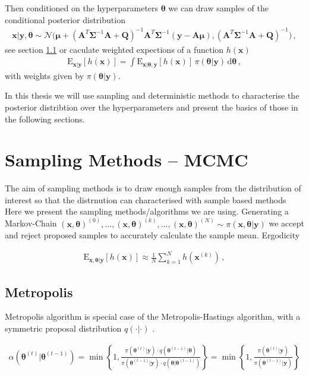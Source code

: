 Then conditioned on the hyperparameters $\bm{\theta}$ we can draw samples of the conditional posterior distribution
\begin{align}
	\bm{x}| \bm{y} , \bm{\theta} \sim \mathcal{N}\big( \bm{\mu} + (\bm{A}^T \bm{\Sigma}^{-1} \bm{A} + \bm{Q} )^{-1} \bm{A}^T \bm{\Sigma}^{-1} (\bm{y} - \bm{A} \bm{\mu}), (\bm{A}^T \bm{\Sigma}^{-1} \bm{A} + \bm{Q} )^{-1} \big) \, ,
\end{align}
see section \ref{} or caculate weighted expections of a function $h(\bm{x})$
\begin{align}
	\label{eq:lte}
	\text{E}_{\bm{x}|\bm{y}} [h(\bm{x})] = \int   \text{E}_{\bm{x}|\bm{\theta},\bm{y}} [h(\bm{x})] \, \pi(\bm{\theta} | \bm{y} )  \, \text{d} \bm{\theta} \,  ,
\end{align}
with weights given by $\pi(\bm{\theta} | \bm{y} )$.
\cite{}

In this thesis we will use sampling and deterministic methods to characterise the posterior distribtion over the hyperparameters and present the basics of those in the following sections.


\section{Sampling Methods -- MCMC}
The aim of sampling methods is to draw enough samples from the distribution of interest so that
the distrnution can characterised with sample based methods
Here we present the sampling methods/algorithms we are using.
Generating a Markov-Chain $ (\bm{x}, \bm{\theta} )^{(0)}, \dots, (\bm{x}, \bm{\theta} )^{(k)} , \dots,  (\bm{x}, \bm{\theta})^{(N)} \sim \pi(\bm{x},\bm{\theta}| \bm{y}) $ we accept and reject proposed samples to accurately calculate the sample mean.
Ergodicity

\begin{align}
	\label{eq:sampMean}
	\text{E}_{\bm{x},\bm{\theta}|\bm{y}} [h(\bm{x})] \approx \frac{1}{N} \sum_{k=1}^{N} h (\bm{x}^{(k)}) \, ,
\end{align}

\subsection{Metropolis}
Metropolis algorithm is special case of the Metropolis-Hastings algorithm, with a symmetric proposal distribution $q(\cdot|\cdot)$ \cite{}.

\begin{align}
\alpha(\bm{\theta}^{(t)}  | \bm{\theta}^{(t-1)}) = \min \left\{ 1, \frac{\pi(\bm{\theta}^{(t)}  | \bm{y}) \cdot 	q(\bm{\theta}^{(t-1)} | \bm{\theta})}{\pi(\bm{\theta}^{(t-1)}|  \bm{y}) \cdot q(\bm{\theta} | \bm{\theta}^{(t-1)})} \right\}= \min \left\{ 1, \frac{\pi(\bm{\theta}^{(t)}  | \bm{y}) }{\pi(\bm{\theta}^{(t-1)}| \bm{y})} \right\}
\end{align}

